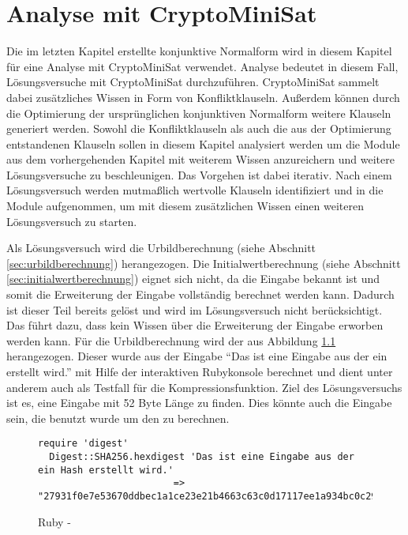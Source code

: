 \chapter{Analyse mit CryptoMiniSat}
\label{chp:analyse}

Die im letzten Kapitel erstellte konjunktive Normalform wird in diesem Kapitel für eine Analyse mit CryptoMiniSat verwendet.
Analyse bedeutet in diesem Fall, Lösungsversuche mit CryptoMiniSat durchzuführen. CryptoMiniSat sammelt dabei zusätzliches Wissen
in Form von Konfliktklauseln. Außerdem können durch die Optimierung der ursprünglichen konjunktiven Normalform weitere Klauseln
generiert werden. Sowohl die Konfliktklauseln als auch die aus der Optimierung entstandenen Klauseln sollen in diesem Kapitel
analysiert werden um die Module aus dem vorhergehenden Kapitel mit weiterem Wissen anzureichern und weitere Lösungsversuche zu
beschleunigen. Das Vorgehen ist dabei iterativ. Nach einem Lösungsversuch werden mutmaßlich wertvolle Klauseln identifiziert
und in die Module aufgenommen, um mit diesem zusätzlichen Wissen einen weiteren Lösungsversuch zu starten.

Als Lösungsversuch wird die Urbildberechnung (siehe Abschnitt \ref{sec:urbildberechnung}) herangezogen. Die Initialwertberechnung
(siehe Abschnitt \ref{sec:initialwertberechnung}) eignet sich nicht, da die Eingabe bekannt ist und somit die Erweiterung der Eingabe
vollständig berechnet werden kann. Dadurch ist dieser Teil bereits gelöst und wird im Lösungsversuch nicht berücksichtigt. Das führt
dazu, dass kein Wissen über die Erweiterung der Eingabe erworben werden kann. Für die Urbildberechnung wird der  aus Abbildung
\ref{fig:ruby-sha256} herangezogen. Dieser wurde aus der Eingabe "`Das ist eine Eingabe aus der ein  erstellt wird."' mit Hilfe
der interaktiven Rubykonsole berechnet und dient unter anderem auch als Testfall für die Kompressionsfunktion. Ziel des Lösungsversuchs
ist es, eine Eingabe mit 52 Byte Länge zu finden. Dies könnte auch die Eingabe sein, die benutzt wurde um den  zu berechnen.
\begin{figure}[!h]
  \centering
  \begin{lstlisting}[]
  require 'digest'
  Digest::SHA256.hexdigest 'Das ist eine Eingabe aus der ein Hash erstellt wird.'
                        => "27931f0e7e53670ddbec1a1ce23e21b4663c63c0d17117ee1a934bc0c294dbe9"
  \end{lstlisting}
  \caption{Ruby - }
  \label{fig:ruby-sha256}
\end{figure}

